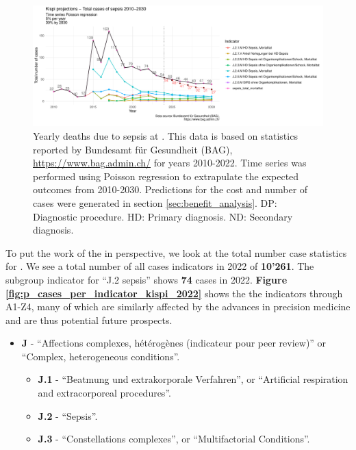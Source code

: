 \begin{figure}[h] \hspace*{0cm} 
\begin{center}
	\includegraphics[width=1\textwidth]{../stats/foph_key_stats/output/p_cases_sepsis_kispi_yearly_forecast}
	\caption{Yearly deaths due to sepsis at \kispi.
	This data is based on statistics reported by Bundesamt für Gesundheit (BAG), 
	\url{https://www.bag.admin.ch/} for years 2010-2022. 
	Time series was performed using Poisson regression to extrapulate the expected outcomes from 2010-2030.
	Predictions for the cost and number of cases were generated in section 
	\ref{sec:benefit_analysis}.	
	DP: Diagnostic procedure.
HD: Primary diagnosis.
ND: Secondary diagnosis.}
	\label{fig:p_cases_sepsis_kispi_yearly_forecast}
\end{center}
\end{figure}

To put the work of the \pmu in perspective, we look at the total number case statistics for \kispi.
We see a total number of all cases indicators in 2022 of \textbf{10'261}.
The subgroup indicator for ``J.2 sepsis'' shows \textbf{74} cases in 2022.
\textbf{Figure \ref{fig:p_cases_per_indicator_kispi_2022}}  shows the the indicators through A1-Z4, many of which are similarly affected by the advances in precision medicine and are thus potential future prospects.

\begin{itemize}
\item \textbf{J} - ``Affections complexes, hétérogènes (indicateur pour peer review)'' or ``Complex, heterogeneous conditions''.
\begin{itemize}
	\item  \textbf{J.1} - ``Beatmung und extrakorporale Verfahren'', or ``Artificial respiration and extracorporeal procedures''.
	\item  \textbf{J.2} - ``Sepsis''.
	\item  \textbf{J.3} - ``Constellations complexes'', or ``Multifactorial Conditions''.
\end{itemize}
\end{itemize}

